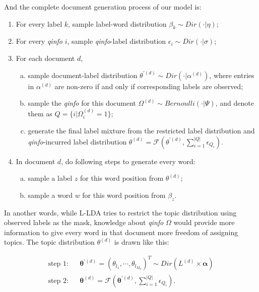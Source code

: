 And the complete document generation process of our model is:

\begin{enumerate}[1.]
\item For every label $k$, sample label-word distribution $\beta_k \sim Dir(\cdot|\eta)$;
\item For every \emph{qinfo} $i$, sample \emph{qinfo}-label distribution $\epsilon_i \sim Dir(\cdot|\sigma)$;
\item For each document $d$, 
  \begin{enumerate}[(a)]
    \item sample document-label distribution $\theta^{\prime(d)} \sim Dir(\cdot|\alpha^{(d)})$, where entries in $\alpha^{(d)}$ are non-zero if and only if corresponding labels are observed;
    \item sample the \emph{qinfo} for this document $\Omega^{(d)} \sim Bernoulli(\cdot|\Psi)$, and denote them as $Q = \{i | \Omega^{(d)}_i = 1\}$;
    \item generate the final label mixture from the restricted label distribution and \emph{qinfo}-incurred label distribution \newline $\theta^{(d)} = \mathcal{F}(\theta^{\prime(d)}, \sum_{i=1}^{|Q|}{\epsilon_{Q_i}})$.  
  \end{enumerate}
\item In document $d$, do following steps to generate every word:
  \begin{enumerate}[(a)]
  \item sample a label $z$ for this word position from $\theta^{(d)}$;
  \item sample a word $w$ for this word position from $\beta_z$.
  \end{enumerate}
\end{enumerate}

In another words, while L-LDA tries to restrict the topic distribution using observed labels as the mask, knowledge about \emph{qinfo} $\Omega$ would provide more information to give every word in that document more freedom of assigning topics. The topic distribution $\theta^{(d)}$ is drawn like this:

\begin{align}
\label{equ:qlda1}
\text{step 1:} & & \boldsymbol{\theta}^{\prime(d)} = (\theta_{l_1},\cdots,\theta_{l_{M_d}})^T \sim Dir(L^{(d)} \times \boldsymbol{\alpha}) \\
\text{step 2:} & & \boldsymbol{\theta}^{(d)} = \mathcal{F}(\boldsymbol{\theta}^{\prime(d)},\sum_{i=1}^{|Q|}{\epsilon_{Q_i}}).
\label{equ:qlda2}
\end{align}

